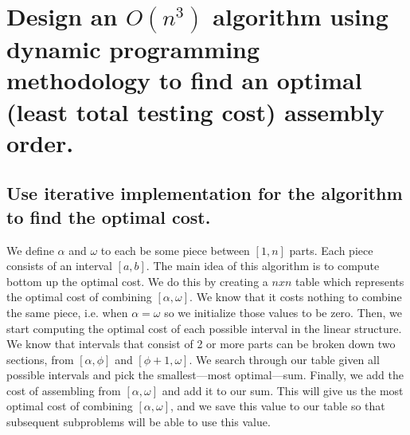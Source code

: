 \documentclass[11pt]{scrartcl}
\begin{document}
	\section{Design an $O(n^3)$ algorithm using dynamic programming methodology to find an optimal
	  (least total testing cost) assembly order.}

	\subsection{
		Use iterative implementation for the algorithm to find the optimal cost.
	}
	We define $\alpha$ and $\omega$ to each be some piece between $[1,n]$ parts. Each piece consists of an interval $[a,b]$.
	The main idea of this algorithm is to compute bottom up the optimal cost. We do this by creating a
	$nxn$ table which represents the optimal cost of combining $[\alpha,\omega]$. We know that it costs
	nothing to combine the same piece, i.e. when $\alpha = \omega$ so we initialize those values to be zero.
	Then, we start computing the optimal cost of each possible interval in the linear structure. We know that intervals
	that consist of 2 or more parts can be broken down two sections, from $[\alpha, \phi]$ and $[\phi+1,\omega]$. We search through our table given
	all possible intervals and pick the smallest---most optimal---sum. Finally, we add the cost of assembling
	from $[\alpha,\omega]$ and add it to our sum. This will give us the most optimal cost of combining
	$[\alpha,\omega]$, and we save this value to our table so that subsequent subproblems will be able to
	use this value.

\end{document}
